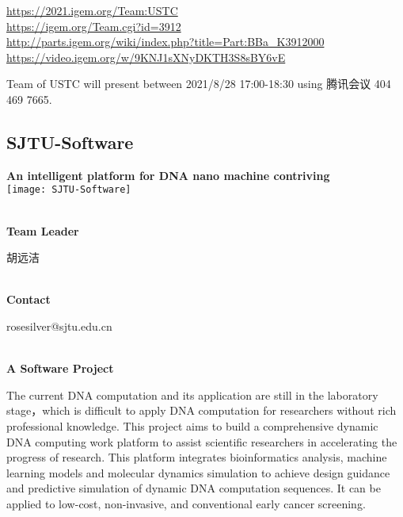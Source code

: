 \url{https://2021.igem.org/Team:USTC }\\
\url{https://igem.org/Team.cgi?id=3912 }\\
\url{http://parts.igem.org/wiki/index.php?title=Part:BBa_K3912000 }\\
\url{https://video.igem.org/w/9KNJ1sXNyDKTH3S8sBY6vE }\\

\vfill{}









Team of USTC will present between        2021/8/28 17:00-18:30 using 腾讯会议 404 469 7665.
\newpage


\subsection{\textcolor{Blu}{ SJTU-Software } }
\vspace{5mm}
\begin{center}
\large{
  \textbf{ An intelligent platform for DNA nano machine contriving }\\

  \texttt{[image: SJTU-Software]}
}
\end{center}
\textbf{\\Team Leader}

  胡远洁


\textbf{\\Contact}

  rosesilver@sjtu.edu.cn


\textbf{\\A Software Project\\}\begin{spacing}{1.5}

The current DNA computation and its application are still in the laboratory stage，which is difficult to apply DNA computation for researchers without rich professional knowledge. This project aims to build a comprehensive dynamic DNA computing work platform to assist scientific researchers in accelerating the progress of research. This platform integrates bioinformatics analysis, machine learning models and molecular dynamics simulation to achieve design guidance and predictive simulation of dynamic DNA computation sequences. It can be applied to low-cost, non-invasive, and conventional early cancer screening.\end{spacing}
\\

